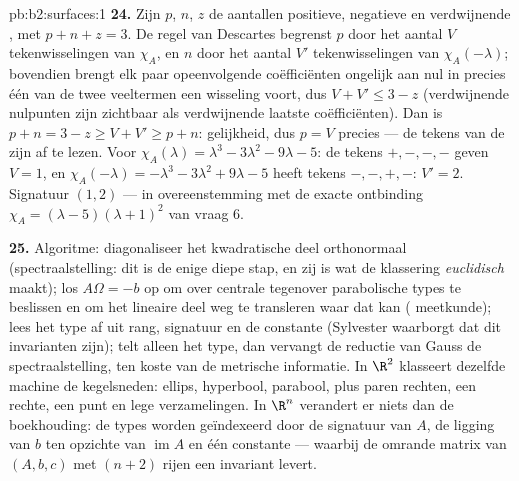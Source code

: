 \begin{solution}{pb:b2:surfaces:1}
\textbf{24.} Zijn $p$, $n$, $z$ de aantallen positieve, negatieve
en verdwijnende , met $p + n + z = 3$. De regel van
Descartes begrenst $p$ door het aantal $V$ tekenwisselingen van
$\chi_A$, en $n$ door het aantal $V'$ tekenwisselingen van
$\chi_A(-\lambda)$; bovendien brengt elk paar opeenvolgende
coëfficiënten ongelijk aan nul in precies één van de twee
veeltermen een wisseling voort, dus $V + V' \leq 3 - z$
(verdwijnende nulpunten zijn zichtbaar als verdwijnende laatste
coëfficiënten). Dan is $p + n = 3 - z \geq V + V' \geq p + n$:
gelijkheid, dus $p = V$ precies --- de tekens van de 
zijn af te lezen. Voor $\chi_A(\lambda) = \lambda^3 - 3\lambda^2 -
9\lambda - 5$: de tekens $+,-,-,-$ geven $V = 1$, en
$\chi_A(-\lambda) = -\lambda^3 - 3\lambda^2 + 9\lambda - 5$ heeft
tekens $-,-,+,-$: $V' = 2$. Signatuur $(1, 2)$ --- in
overeenstemming met de exacte ontbinding $\chi_A = (\lambda -
5)(\lambda + 1)^2$ van vraag 6.

\textbf{25.} Algoritme: diagonaliseer het kwadratische deel
orthonormaal (spectraalstelling: dit is de enige  diepe
stap, en zij is wat de klassering \emph{euclidisch} maakt); los
$A\Omega = -b$ op om over centrale tegenover parabolische types te
beslissen en om het lineaire deel weg te transleren waar dat kan
( meetkunde); lees het type af uit rang, signatuur en de
constante (Sylvester waarborgt dat dit invarianten zijn); telt
alleen het  type, dan vervangt de reductie van Gauss de
spectraalstelling, ten koste van de metrische informatie. In
$\R^2$ klasseert dezelfde machine de kegelsneden: ellips,
hyperbool, parabool, plus paren rechten, een rechte, een punt en
lege verzamelingen. In $\R^n$ verandert er niets dan de
boekhouding: de types worden geïndexeerd door de signatuur van $A$,
de ligging van $b$ ten opzichte van $\operatorname{im}A$ en één
constante --- waarbij de omrande matrix van $(A, b, c)$ met
$(n{+}2)$ rijen een  invariant levert.
\end{solution}
